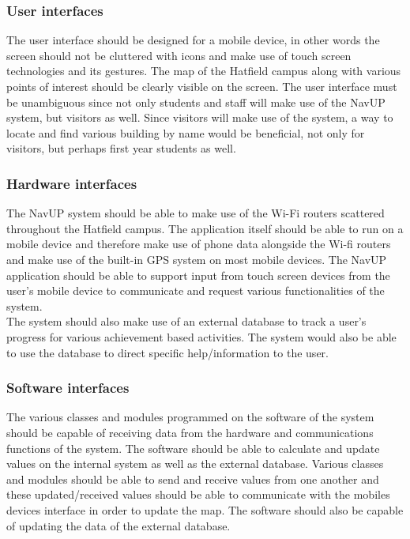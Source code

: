 \documentclass[a4paper,12pt]{article}
\begin{document}
\subsubsection{User interfaces}
The user interface should be designed for a mobile device, in other words the screen should not be cluttered with icons and make use of touch screen technologies and its gestures. The map of the Hatfield campus along with various points of interest should be clearly visible on the screen. The user interface must be unambiguous since not only students and staff will make use of the NavUP system, but visitors as well. Since visitors will make use of the system, a way to locate and find various building by name would be beneficial, not only for visitors, but perhaps first year students as well.
\subsubsection{Hardware interfaces}
The NavUP system should be able to make use of the Wi-Fi routers scattered throughout the Hatfield campus. The application itself should be able to run on a mobile device and therefore make use of phone data alongside the Wi-fi routers and make use of the built-in GPS system on most mobile devices. The NavUP application should be able to support input from touch screen devices from the user’s mobile device to communicate and request various functionalities of the system.\\
The system should also make use of an external database to track a user’s progress for various achievement based activities. The system would also be able to use the database to direct specific help/information to the user.
\subsubsection{Software interfaces}
The various classes and modules programmed on the software of the system should be capable of receiving data from the hardware and communications functions of the system. The software should be able to calculate and update values on the internal system as well as the external database. Various classes and modules should be able to send and receive values from one another and these updated/received values should be able to communicate with the mobiles devices interface in order to update the map. The software should also be capable of updating the data of the external database.\\
\end{document}
